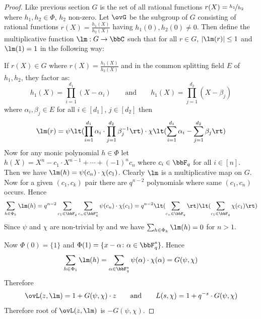 \begin{proof}
  Like previous section $G$ is the set of all rational functions $r(X)=\nicefrac{h_1}{h_2}$ where $h_1,h_2\in\Phi$, $h_2$ non-zero. Let $\ovG$ be the subgroup of $G$ consisting of rational functions $r(X)=\frac{h_1(X)}{h_2(X)}$ having $h_1(0),h_2(0)\neq 0$. Then define the multiplicative function $\lm:G\to \bbC$ such that for all $r\in G$, $|\lm(r)|\leq 1$ and $\lm(1)=1$ in the following way: 

  If $r(X)\in G$ where $r(X)=\frac{h_1(X)}{h_2(X)}$ and in the common splitting field $E$ of $h_1,h_2$, they factor as: $$h_1(X)=\prod_{i=1}^{d_1}(X-\alpha_i)\qquad \text{and}\qquad h_1(X)=\prod_{j=1}^{d_2}(X-\beta_j)$$ where $\alpha_i,\beta_j\in E$ for all $i\in[d_1]$, $j\in[d_2]$ then $$\lm(r)=\psi\lt(\prod_{i=1}^{d_1}\alpha_i \cdot \prod_{j=1}^{d_2}\beta_j^{-1}\rt)\cdot \chi\lt(\sum_{i=1}^{d_1}\alpha_i-\sum_{j=1}^{d_2}\beta_j\rt)$$Now for any monic polynomial $h\in\Phi$ let $h(X)=X^n-c_1\cdot X^{n-1}+\cdots +(-1)^nc_n$ where $c_i\in\bbF_q$ for all $i\in[n]$. Then we have $\lm(h)=\psi(c_n)\cdot \chi(c_1)$. Clearly $\lm$ is a multiplicative map on $G$. Now for a given $(c_1,c_k)$ pair there are $q^{n-2}$ polynomials where same $(c_1,c_n)$ occurs. Hence $$\sum_{h\in\Phi_k}\lm(h)=q^{n-2}\sum_{c_1\in\bbF_q}\sum_{c_n\in\bbF_q^*}\psi(c_n)\cdot \chi(c_1)=q^{n-2}\lt(\sum_{c_n\in\bbF_q}\rt)\lt(\sum_{c_1\in\bbF_q}\chi(c_1)\rt)$$Since $\psi$ and $\chi$ are non-trivial by  and  we have $\sum_{h\in\Phi_k}\lm(h)=0$ for $n>1$. 

  Now $\Phi(0)=\{1\}$ and $\Phi(1)=\{x-\alpha\colon \alpha\in\bbF_q^*\}$. Hence $$\sum_{h\in\Phi_1}\lm(h)=\sum_{\alpha\in\bbF_q^*}\psi(\alpha)\cdot \chi(\alpha)=G(\psi,\chi)$$Therefore $$\ovL(z,\lm)=1+G(\psi,\chi)\cdot z\qquad\text{and}\qquad L(s,\chi)=1+q^{-s}\cdot G(\psi,\chi)$$Therefore root of $\ovL(z,\lm)$ is $-G(\psi,\chi)$.  


\end{proof}
